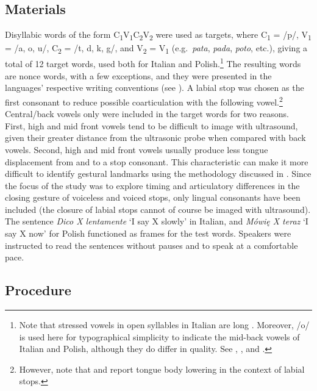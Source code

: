 \documentclass[preprint]{JASAnew}
\begin{document}
\hypertarget{materials}{%
\subsection{Materials}\label{materials}}

Disyllabic words of the form
C\textsubscript{1}V\textsubscript{1}C\textsubscript{2}V\textsubscript{2}
were used as targets, where C\textsubscript{1} = /p/, V\textsubscript{1}
= /a, o, u/, C\textsubscript{2} = /t, d, k, g/, and V\textsubscript{2} =
V\textsubscript{1} (e.g.~\emph{pata}, \emph{pada}, \emph{poto}, etc.),
giving a total of 12 target words, used both for Italian and
Polish.\footnote{Note that stressed vowels in open syllables in Italian are long \citep{renwick2016}. Moreover, /o/ is used here for typographical simplicity to indicate the mid-back vowels of Italian and Polish, although they do differ in quality. See \citet{kramer2009}, \citet{renwick2016}, and \citet{gussmann2007}.}
The resulting words are nonce words, with a few exceptions, and they
were presented in the languages' respective writing conventions (see
). A labial stop was chosen as the first consonant to
reduce possible coarticulation with the following
vowel.\footnote{However, note that \citet{westbury1983} and \citet{vazquez-alvarez2007} report tongue body lowering in the context of labial stops.}
Central/back vowels only were included in the target words for two
reasons. First, high and mid front vowels tend to be difficult to image
with ultrasound, given their greater distance from the ultrasonic probe
when compared with back vowels. Second, high and mid front vowels
usually produce less tongue displacement from and to a stop consonant.
This characteristic can make it more difficult to identify gestural
landmarks using the methodology discussed in . Since the
focus of the study was to explore timing and articulatory differences in
the closing gesture of voiceless and voiced stops, only lingual
consonants have been included (the closure of labial stops cannot of
course be imaged with ultrasound). The sentence \emph{Dico X lentamente}
`I say X slowly' in Italian, and \emph{Mówię X teraz} `I say X now' for
Polish functioned as frames for the test words. Speakers were instructed
to read the sentences without pauses and to speak at a comfortable pace.

\hypertarget{procedure}{%
\subsection{Procedure}\label{procedure}}
\end{document}
